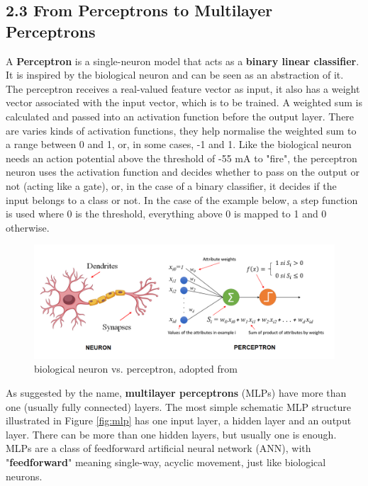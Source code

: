 \documentclass[nobib]{tufte-handout}
\begin{document}
\subsection{2.3 \textbf{From Perceptrons to Multilayer Perceptrons}}

A \textbf{Perceptron} is a single-neuron model that acts as a \textbf{binary linear classifier}. It is inspired by the biological neuron and can be seen as an abstraction of it. The perceptron receives a real-valued feature vector as input, it also has a weight vector associated with the input vector, which is to be trained. A weighted sum is calculated and passed into an activation function before the output layer. There are varies kinds of activation functions, they help normalise the weighted sum to a range between 0 and 1, or, in some cases, -1 and 1. Like the biological neuron needs an action potential above the threshold of -55 mA to "fire", the perceptron neuron uses the activation function and decides whether to pass on the output or not (acting like a gate), or, in the case of a binary classifier, it decides if the input belongs to a class or not. In the case of the example below, a step function is used where 0 is the threshold, everything above 0 is mapped to 1 and 0 otherwise. \\
\begin{figure}[h!]
  \centering
  \includegraphics{perceptron1.png}
  \caption{biological neuron vs. perceptron, adopted from \cite{IF:perceptron}}
\end{figure}
As suggested by the name, \textbf{multilayer perceptrons} (MLPs) have more than one (usually fully connected) layers. The most simple schematic MLP structure illustrated in Figure \ref{fig:mlp} has one input layer, a hidden layer and an output layer. There can be more than one hidden layers, but usually one is enough. MLPs are a class of feedforward artificial neural network (ANN), with "\textbf{feedforward}" meaning single-way, acyclic movement, just like biological neurons.\\ 
\end{document}
